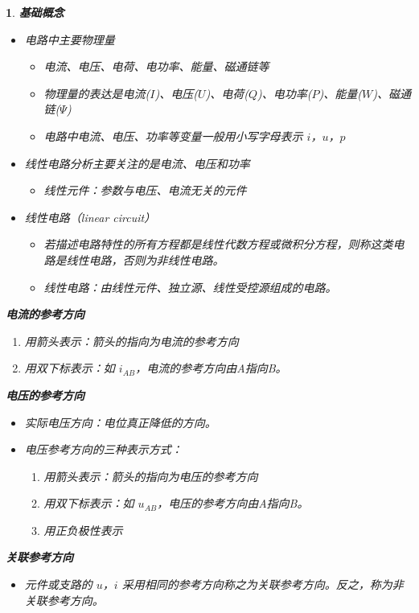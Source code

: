 \documentclass[UTF8]{report}
\theoremstyle{MyLineTheoremStyle} %
\theoremstyle{MyBlockTheoremStyle} %
\theoremstyle{MySubsubsectionStyle} %
\newtheorem{definition}{}
\begin{document}
\begin{definition}
    \textbf{基础概念}
    \begin{itemize}
        \item 电路中主要物理量
        \begin{itemize}
            \item 电流、电压、电荷、电功率、能量、磁通链等
            \item 物理量的表达是电流($I$)、电压($U$)、电荷($Q$)、电功率($P$)、能量($W$)、磁通链($\Psi$)
            \item 电路中电流、电压、功率等变量一般用小写字母表示 $i$，$u$，$p$
        \end{itemize}
        \item 线性电路分析主要关注的是电流、电压和功率
        \begin{itemize}
            \item 线性元件：参数与电压、电流无关的元件
        \end{itemize}
        \item 线性电路（linear circuit）
        \begin{itemize}
            \item 若描述电路特性的所有方程都是线性代数方程或微积分方程，则称这类电路是线性电路，否则为非线性电路。
            \item 线性电路：由线性元件、独立源、线性受控源组成的电路。
        \end{itemize}
    \end{itemize}

    \textbf{电流的参考方向}
    \begin{enumerate}
        \item 用箭头表示：箭头的指向为电流的参考方向
        \item 用双下标表示：如 $i_{AB}$，电流的参考方向由A指向B。
    \end{enumerate}

    \textbf{电压的参考方向}
    \begin{itemize}
        \item 实际电压方向：电位真正降低的方向。
        \item 电压参考方向的三种表示方式：
        \begin{enumerate}
            \item 用箭头表示：箭头的指向为电压的参考方向
            \item 用双下标表示：如 $u_{AB}$，电压的参考方向由A指向B。
            \item 用正负极性表示
        \end{enumerate}
    \end{itemize}

    \textbf{关联参考方向}
    \begin{itemize}
        \item 元件或支路的 $u$，$i$ 采用相同的参考方向称之为关联参考方向。反之，称为非关联参考方向。
    \end{itemize}
\end{definition}
\end{document}
